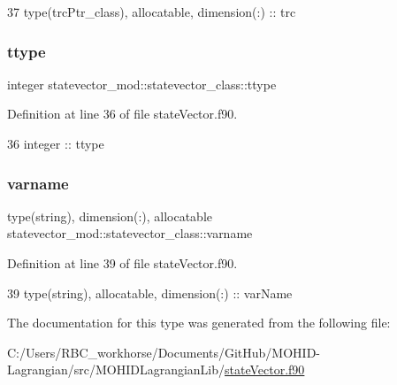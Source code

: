 \begin{DoxyCode}
37         \textcolor{keywordtype}{type}(trcPtr\_class), \textcolor{keywordtype}{allocatable}, \textcolor{keywordtype}{dimension(:)} :: trc
\end{DoxyCode}
\mbox{\label{structstatevector__mod_1_1statevector__class_a01e7628eb9959749a93b74a5bb21754c}} 
\subsubsection{\texorpdfstring{ttype}{ttype}}
{\footnotesize\ttfamily integer statevector\+\_\+mod\+::statevector\+\_\+class\+::ttype\hspace{0.3cm}{\ttfamily [private]}}



Definition at line 36 of file state\+Vector.\+f90.


\begin{DoxyCode}
36         \textcolor{keywordtype}{integer} :: ttype
\end{DoxyCode}
\mbox{\label{structstatevector__mod_1_1statevector__class_acc9916606d867a6fcd9e3a37d68ce302}} 
\subsubsection{\texorpdfstring{varname}{varname}}
{\footnotesize\ttfamily type(string), dimension(\+:), allocatable statevector\+\_\+mod\+::statevector\+\_\+class\+::varname\hspace{0.3cm}{\ttfamily [private]}}



Definition at line 39 of file state\+Vector.\+f90.


\begin{DoxyCode}
39         \textcolor{keywordtype}{type}(string), \textcolor{keywordtype}{allocatable}, \textcolor{keywordtype}{dimension(:)} :: varName
\end{DoxyCode}


The documentation for this type was generated from the following file\+:\begin{DoxyCompactItemize}
\item 
C\+:/\+Users/\+R\+B\+C\+\_\+workhorse/\+Documents/\+Git\+Hub/\+M\+O\+H\+I\+D-\/\+Lagrangian/src/\+M\+O\+H\+I\+D\+Lagrangian\+Lib/\mbox{\hyperlink{state_vector_8f90}{state\+Vector.\+f90}}\end{DoxyCompactItemize}
